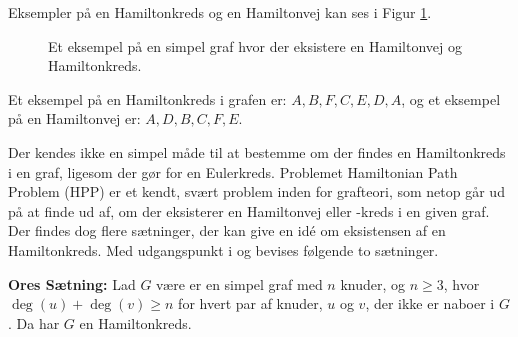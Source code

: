 \begin{exmp}
	Eksempler på en Hamiltonkreds og en Hamiltonvej kan ses i Figur \ref{hamiltion_vej_kreds}.
	
	\begin{figure}[h]
		\centering
		
		\caption{Et eksempel på en simpel graf hvor der eksistere en Hamiltonvej og Hamiltonkreds.} \label{hamiltion_vej_kreds}
	\end{figure}
	
	Et eksempel på en Hamiltonkreds i grafen er: $A,B,F,C,E,D,A$, og
	et eksempel på en Hamiltonvej er: $A,D,B,C,F,E$.
\end{exmp}

Der kendes ikke en simpel måde til at bestemme om der findes en Hamiltonkreds i en graf, ligesom der gør for en Eulerkreds. 
Problemet Hamiltonian Path Problem (HPP) er et kendt, svært problem inden for grafteori, som netop går ud på at finde ud af, om der eksisterer en Hamiltonvej eller -kreds i en given graf.
Der findes dog flere sætninger, der kan give en idé om eksistensen af en Hamiltonkreds. Med udgangspunkt i \citep{wilson_graph} og \citep{orebevis} bevises følgende to sætninger.



\begin{thm} \label{ores_thm}
	\textbf{Ores Sætning:} 
	Lad $G$ være er en simpel graf med $n$ knuder, og $n\geq3$, hvor $\deg(u)+\deg(v)\geq n$ for hvert par af knuder, $u$ og $v$, der ikke er naboer i $G$. 
	Da har $G$ en Hamiltonkreds. 
\end{thm}

